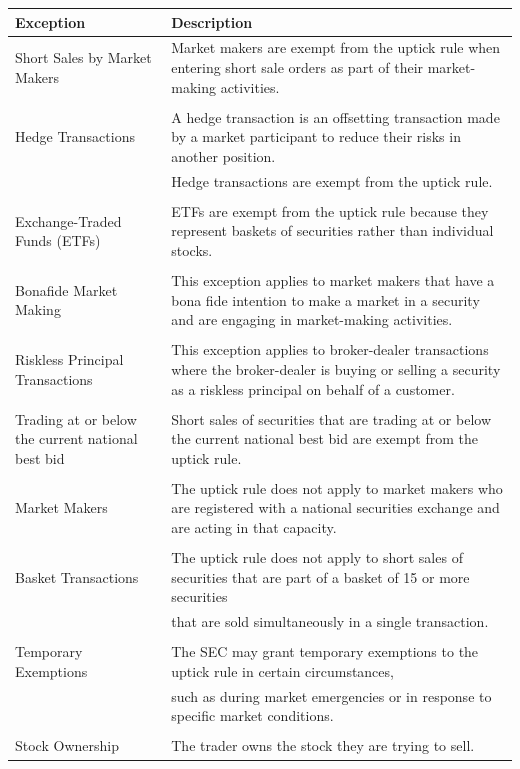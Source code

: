 \documentclass[11pt]{article}
\begin{document}
\begin{center}
\begin{tabular}{ll}
\hline
Exception & Description\\[0pt]
\hline
Short Sales by Market Makers & Market makers are exempt from the uptick rule when entering short sale orders as part of their market-making activities.\\[0pt]
 & \\[0pt]
Hedge Transactions & A hedge transaction is an offsetting transaction made by a market participant to reduce their risks in another position.\\[0pt]
 & Hedge transactions are exempt from the uptick rule.\\[0pt]
 & \\[0pt]
Exchange-Traded Funds (ETFs) & ETFs are exempt from the uptick rule because they represent baskets of securities rather than individual stocks.\\[0pt]
 & \\[0pt]
Bonafide Market Making & This exception applies to market makers that have a bona fide intention to make a market in a security and are engaging in market-making activities.\\[0pt]
 & \\[0pt]
Riskless Principal Transactions & This exception applies to broker-dealer transactions where the broker-dealer is buying or selling a security as a riskless principal on behalf of a customer.\\[0pt]
 & \\[0pt]
Trading at or below the current national best bid & Short sales of securities that are trading at or below the current national best bid are exempt from the uptick rule.\\[0pt]
 & \\[0pt]
Market Makers & The uptick rule does not apply to market makers who are registered with a national securities exchange and are acting in that capacity.\\[0pt]
 & \\[0pt]
Basket Transactions & The uptick rule does not apply to short sales of securities that are part of a basket of 15 or more securities\\[0pt]
 & that are sold simultaneously in a single transaction.\\[0pt]
 & \\[0pt]
Temporary Exemptions & The SEC may grant temporary exemptions to the uptick rule in certain circumstances,\\[0pt]
 & such as during market emergencies or in response to specific market conditions.\\[0pt]
 & \\[0pt]
Stock Ownership & The trader owns the stock they are trying to sell.\\[0pt]
\hline
\end{tabular}
\end{center}
\end{document}
